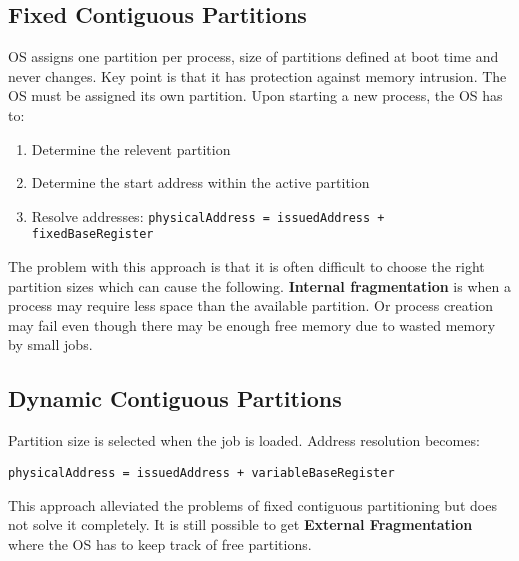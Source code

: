 \documentclass[11pt]{article}
\begin{document}
\subsection{Fixed Contiguous Partitions}
\label{sec:org17342b3}
OS assigns one partition per process, size of partitions defined at boot time and never changes.
Key point is that it has protection against memory intrusion.
The OS must be assigned its own partition.
Upon starting a new process, the OS has to:
\begin{enumerate}
\item Determine the relevent partition
\item Determine the start address within the active partition
\item Resolve addresses: \texttt{physicalAddress = issuedAddress + fixedBaseRegister}
\end{enumerate}
The problem with this approach is that it is often difficult to choose the right partition sizes which can cause the following.
\textbf{Internal fragmentation} is when a process may require less space than the available partition.
Or process creation may fail even though there may be enough free memory due to wasted memory by small jobs.

\subsection{Dynamic Contiguous Partitions}
\label{sec:org7677b29}
Partition size is selected when the job is loaded.
Address resolution becomes: 

\texttt{physicalAddress = issuedAddress + variableBaseRegister}

This approach alleviated the problems of fixed contiguous partitioning but does not solve it completely.
It is still possible to get \textbf{External Fragmentation} where the OS has to keep track of free partitions.
\end{document}
